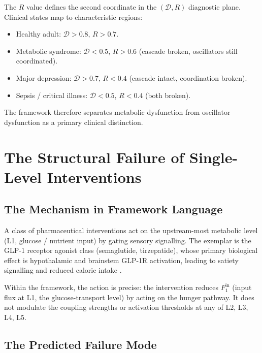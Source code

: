 \documentclass[11pt,twocolumn,a4paper]{article}
\theoremstyle{definition}
\theoremstyle{remark}
\newcommand{\Dhier}{\mathcal{D}}
\newcommand{\Fin}{F^{\mathrm{in}}}
\newcommand{\Rcoh}{R}
\begin{document}
The $\Rcoh$ value defines the second coordinate in the
$(\Dhier, \Rcoh)$ diagnostic plane. Clinical states map to
characteristic regions:

\begin{itemize}[leftmargin=*]
\item Healthy adult: $\Dhier > 0.8$, $\Rcoh > 0.7$.
\item Metabolic syndrome: $\Dhier < 0.5$, $\Rcoh > 0.6$ (cascade
broken, oscillators still coordinated).
\item Major depression: $\Dhier > 0.7$, $\Rcoh < 0.4$ (cascade
intact, coordination broken).
\item Sepsis / critical illness: $\Dhier < 0.5$, $\Rcoh < 0.4$
(both broken).
\end{itemize}

The framework therefore separates metabolic dysfunction from
oscillator dysfunction as a primary clinical distinction.

\section{The Structural Failure of Single-Level Interventions}
\label{sec:single-level}

\subsection{The Mechanism in Framework Language}

A class of pharmaceutical interventions act on the upstream-most
metabolic level (L1, glucose / nutrient input) by gating sensory
signalling. The exemplar is the GLP-1 receptor agonist class
(semaglutide, tirzepatide), whose primary biological effect is
hypothalamic and brainstem GLP-1R activation, leading to satiety
signalling and reduced caloric intake \citep{wilding2022, davies2024,
drucker2018}.

Within the framework, the action is precise: the intervention
reduces $\Fin_1$ (input flux at L1, the glucose-transport level) by
acting on the hunger pathway. It does not modulate the coupling
strengths or activation thresholds at any of L2, L3, L4, L5.

\subsection{The Predicted Failure Mode}
\end{document}
